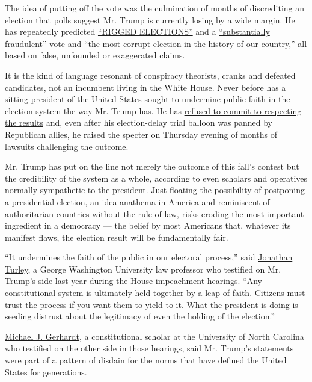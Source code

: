 The idea of putting off the vote was the culmination of months of
discrediting an election that polls suggest Mr. Trump is currently
losing by a wide margin. He has repeatedly predicted
\href{https://twitter.com/realDonaldTrump/status/1256366878873792512}{``RIGGED
ELECTIONS''} and a
\href{https://twitter.com/realDonaldTrump/status/1265255835124539392?s=20}{``substantially
fraudulent''} vote and
\href{https://www.nytimes.com/2020/06/23/us/politics/trump-arizona.html}{``the
most corrupt election in the history of our country,''} all based on
false, unfounded or exaggerated claims.

It is the kind of language resonant of conspiracy theorists, cranks and
defeated candidates, not an incumbent living in the White House. Never
before has a sitting president of the United States sought to undermine
public faith in the election system the way Mr. Trump has. He has
\href{https://www.nytimes.com/aponline/2020/07/19/us/politics/ap-us-trump.html}{refused
to commit to respecting the results} and, even after his election-delay
trial balloon was panned by Republican allies, he raised the specter on
Thursday evening of months of lawsuits challenging the outcome.

Mr. Trump has put on the line not merely the outcome of this fall's
contest but the credibility of the system as a whole, according to even
scholars and operatives normally sympathetic to the president. Just
floating the possibility of postponing a presidential election, an idea
anathema in America and reminiscent of authoritarian countries without
the rule of law, risks eroding the most important ingredient in a
democracy --- the belief by most Americans that, whatever its manifest
flaws, the election result will be fundamentally fair.

``It undermines the faith of the public in our electoral process,'' said
\href{https://www.nytimes.com/2019/12/04/us/politics/jonathan-turley.html}{Jonathan
Turley}, a George Washington University law professor who testified on
Mr. Trump's side last year during the House impeachment hearings. ``Any
constitutional system is ultimately held together by a leap of faith.
Citizens must trust the process if you want them to yield to it. What
the president is doing is seeding distrust about the legitimacy of even
the holding of the election.''

\href{https://www.nytimes.com/2019/12/04/us/politics/michael-gerhardt.html}{Michael
J. Gerhardt}, a constitutional scholar at the University of North
Carolina who testified on the other side in those hearings, said Mr.
Trump's statements were part of a pattern of disdain for the norms that
have defined the United States for generations.

